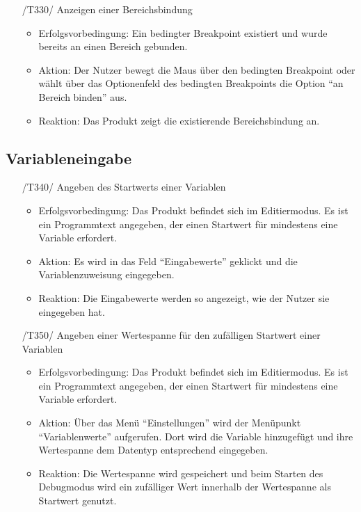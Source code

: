 \documentclass[parskip=full]{scrartcl}
\begin{document}
\begin{itemize}
	\item[/T330/] Anzeigen einer Bereichsbindung
		\begin{itemize}
		\item Erfolgsvorbedingung: Ein bedingter Breakpoint existiert und wurde bereits an einen Bereich gebunden. 
		\item Aktion: Der Nutzer bewegt die Maus über den bedingten Breakpoint oder wählt über das Optionenfeld des bedingten Breakpoints die Option \enquote{an Bereich binden} aus. 
		\item Reaktion:	Das Produkt zeigt die existierende Bereichsbindung an.  
		\end{itemize}	
	
		
\end{itemize}

\newpage
\subsection{Variableneingabe}



\begin{itemize}

\item[/T340/] Angeben des Startwerts einer Variablen
		\begin{itemize}
		\item Erfolgsvorbedingung: Das Produkt befindet sich im Editiermodus. Es ist ein Programmtext angegeben, der einen Startwert für mindestens eine Variable erfordert.
		\item Aktion: Es wird in das Feld \enquote{Eingabewerte} geklickt und die Variablenzuweisung eingegeben.
		\item Reaktion: Die Eingabewerte werden so angezeigt, wie der Nutzer sie eingegeben hat.
		\end{itemize}	
	
\item[/T350/] Angeben einer Wertespanne für den zufälligen Startwert einer Variablen
		\begin{itemize}
		\item Erfolgsvorbedingung: Das Produkt befindet sich im Editiermodus. Es ist ein Programmtext angegeben, der einen Startwert für mindestens eine Variable erfordert.
		\item Aktion: Über das Menü \enquote{Einstellungen} wird der Menüpunkt \enquote{Variablenwerte} aufgerufen. Dort wird die Variable hinzugefügt und ihre Wertespanne dem Datentyp entsprechend eingegeben.
		\item Reaktion: Die Wertespanne wird gespeichert und beim Starten des Debugmodus wird ein zufälliger Wert innerhalb der Wertespanne als Startwert genutzt.
		\end{itemize}
	
\end{itemize}
\end{document}
